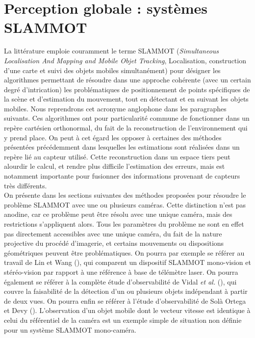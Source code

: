 \section{Perception globale : systèmes SLAMMOT} \label{sec:ch2_Algo_total}
La littérature emploie couramment le terme SLAMMOT (\emph{Simultaneous Localisation And Mapping and Mobile Objet Tracking}, Localisation, construction d'une carte et suivi des objets mobiles simultanément) pour désigner les algorithmes permettant de résoudre dans une approche cohérente (avec un certain degré d'intrication) les problématiques de positionnement de points spécifiques de la scène et d'estimation du mouvement, tout en détectant et en suivant les objets mobiles. Nous reprendrons cet acronyme anglophone dans les paragraphes suivants. Ces algorithmes ont pour particularité commune de fonctionner dans un repère cartésien orthonormal, du fait de la reconstruction de l'environnement qui y prend place. On peut à cet égard les opposer à certaines des méthodes présentées précédemment dans lesquelles les estimations sont réalisées dans un repère lié au capteur utilisé. Cette reconstruction dans un espace tiers peut alourdir le calcul, et rendre plus difficile l'estimation des erreurs, mais est notamment importante pour fusionner des informations provenant de capteurs très différents.\\

On présente dans les sections suivantes des méthodes proposées pour résoudre le problème SLAMMOT avec une ou plusieurs caméras. Cette distinction n'est pas anodine, car ce problème peut être résolu avec une unique caméra, mais des restrictions s'appliquent alors. Tous les paramètres du problème ne sont en effet pas directement accessibles avec une unique caméra, du fait de la nature projective du procédé d'imagerie, et certains mouvements ou dispositions géométriques peuvent être problématiques. On pourra par exemple se référer au travail de Lin et Wang (\cite{Lina}), qui comparent un dispositif SLAMMOT mono-vision et stéréo-vision par rapport à une référence à base de télémètre laser. On pourra également se référer à la complète étude d'observabilité de Vidal \textit{et al.} (\cite{Vidal2002}), qui couvre la faisabilité de la détection d'un ou plusieurs objets indépendant à partir de deux vues. On pourra enfin se référer à l'étude d'observabilité de Solà Ortega et Devy (\cite{Ortega2007}). L'observation d'un objet mobile dont le vecteur vitesse est identique à celui du référentiel de la caméra est un exemple simple de situation non définie pour un système SLAMMOT mono-caméra.

